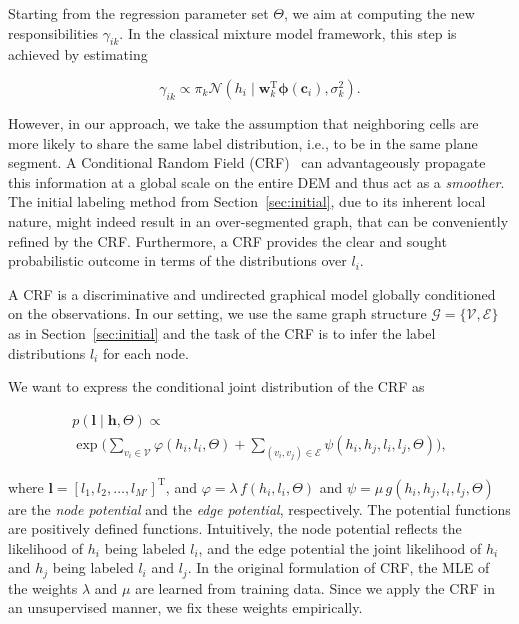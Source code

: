 Starting from the regression parameter set $\Theta$, we aim at computing the new
responsibilities $\gamma_{ik}$. In the classical mixture model framework, this
step is achieved by estimating

\begin{equation}
\label{eqn:responsibilities}
\gamma_{ik}\propto \pi_k\mathcal{N}(h_i\mid\mathbf{w}_k^\text{T}
\boldsymbol{\phi}(\mathbf{c}_i),\sigma^2_k).
\end{equation}

However, in our approach, we take the assumption that neighboring cells are more
likely to share the same label distribution, i.e., to be in the same plane
segment. A Conditional Random Field (CRF)~\cite{lafferty01conditional}
can advantageously propagate this information at a global scale on the entire
DEM and thus act as a \emph{smoother}. The initial labeling method from
Section~\ref{sec:initial}, due to its inherent local nature, might indeed result
in an over-segmented graph, that can be conveniently refined by the CRF.
Furthermore, a CRF provides the clear and sought probabilistic outcome in terms
of the distributions over $l_i$.

A CRF is a discriminative and undirected graphical model globally conditioned on
the observations. In our setting, we use the same graph structure
$\mathcal{G}=\{\mathcal{V},\mathcal{E}\}$ as in Section~\ref{sec:initial} and
the task of the CRF is to infer the label distributions $l_i$ for each node.

We want to express the conditional joint distribution of the CRF as

\begin{eqnarray}
\label{eqn:crf_joint}
p(\mathbf{l}\mid\mathbf{h},\Theta)\propto
\phantom{aaaaaaaaaaaaaaaaaaaaaaaaaaaaaaaaaa}\\ \nonumber
\exp\bigg(\sum_{v_i\in\mathcal{V}}
\varphi(h_i,l_i,\Theta)+\sum_{(v_i,v_j)\in\mathcal{E}}
\psi(h_i,h_j,l_i,l_j,\Theta)\bigg),
\end{eqnarray}

where $\mathbf{l}=[l_1,l_2,\dots,l_{M'}]^\text{T}$, and $\varphi=
\lambda\,f(h_i,l_i,\Theta)$ and $\psi=\mu\,g(h_i,h_j,l_i,l_j,\Theta)$ are the
\emph{node potential} and the \emph{edge potential}, respectively. The potential
functions are positively defined functions. Intuitively, the node potential
reflects the likelihood of $h_i$ being labeled $l_i$, and the edge potential the
joint likelihood of $h_i$ and $h_j$ being labeled $l_i$ and $l_j$. In the
original formulation of CRF, the MLE of the weights $\lambda$ and $\mu$ are
learned from training data. Since we apply the CRF in an unsupervised manner, we
fix these weights empirically.

